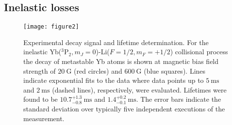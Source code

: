 \documentclass[twocolumn,superscriptaddress,showpacs,floatfix,amsmath,amssymb]{revtex4-1}
\newcommand{\triplet}{{}^3\mathrm{P}_2}
\newcommand{\msec}{\mathrm{ms}}
\newcommand{\G}{\mathrm{G}}
\begin{document}
\subsection{Inelastic losses}
\label{sec:inel}

\begin{figure}[tb]
	\centering
	\texttt{[image: figure2]}
	\caption{
		Experimental decay signal and lifetime determination. For the inelastic
		Yb($\triplet, m_J = 0$)-Li($F = 1/2, m_F = +1/2$) collisional process the
		decay of metastable Yb atoms is shown at magnetic bias field strength of
		$20~\G$ (red circles) and $600~\G$ (blue squares). Lines indicate
		exponential fits to the data where data points up to $5~\msec$ and
		$2~\msec$ (dashed lines), respectively, were evaluated. Lifetimes were
		found to be $10.7^{+1.3}_{-0.8}~\msec$ and $1.4^{+0.2}_{-0.1}~\msec$. The
		error bars indicate the standard deviation over typically five independent
		executions of the measurement.
	}
	\label{fig:decay}
\end{figure}
\end{document}

